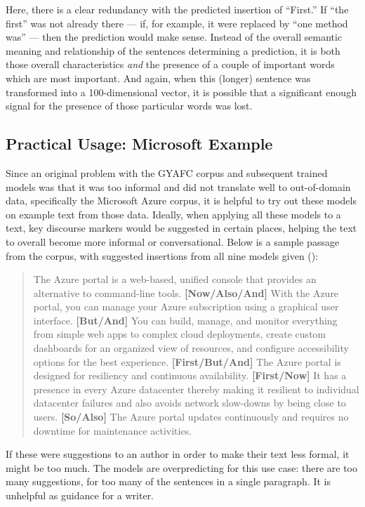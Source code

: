 Here, there is a clear redundancy with the predicted insertion of ``First.'' If ``the first'' was not already there --- if, for example, it were replaced by ``one method was'' --- then the prediction would make sense. Instead of the overall semantic meaning and relationship of the sentences determining a prediction, it is both those overall characteristics \textit{and} the presence of a couple of important words which are most important. And again, when this (longer) sentence was transformed into a 100-dimensional vector, it is possible that a significant enough signal for the presence of those particular words was lost.

\subsection{Practical Usage: Microsoft Example}

Since an original problem with the GYAFC corpus and subsequent trained models was that it was too informal and did not translate well to out-of-domain data, specifically the Microsoft Azure corpus, it is helpful to try out these models on example text from those data. Ideally, when applying all these models to a text, key discourse markers would be suggested in certain places, helping the text to overall become more informal or conversational. Below is a sample passage from the corpus, with suggested insertions from all nine models given (\cite{microsoft2019azure}):

\begin{quote}
The Azure portal is a web-based, unified console that provides an alternative to command-line tools. \textbf{[Now/Also/And]} With the Azure portal, you can manage your Azure subscription using a graphical user interface. \textbf{[But/And]} You can build, manage, and monitor everything from simple web apps to complex cloud deployments, create custom dashboards for an organized view of resources, and configure accessibility options for the best experience. \textbf{[First/But/And]} The Azure portal is designed for resiliency and continuous availability. \textbf{[First/Now]} It has a presence in every Azure datacenter thereby making it resilient to individual datacenter failures and also avoids network slow-downs by being close to users. \textbf{[So/Also]} The Azure portal updates continuously and requires no downtime for maintenance activities.
\end{quote}

If these were suggestions to an author in order to make their text less formal, it might be too much. The models are overpredicting for this use case: there are too many suggestions, for too many of the sentences in a single paragraph. It is unhelpful as guidance for a writer.

